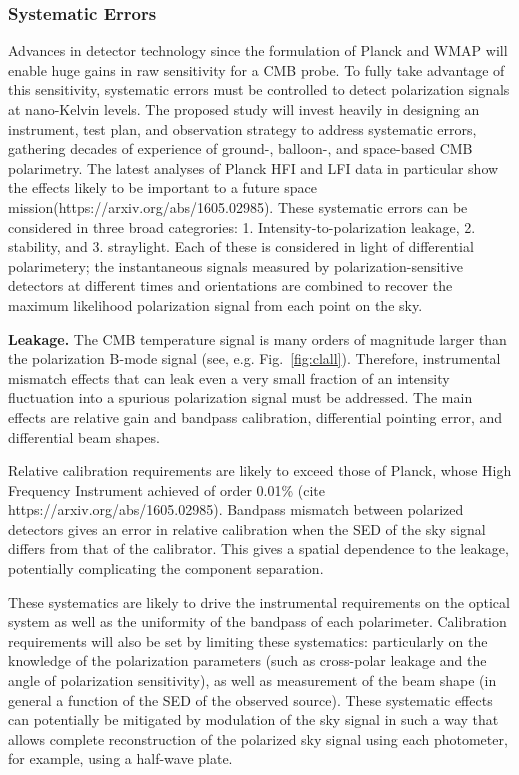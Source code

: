 \subsubsection{Systematic Errors}
Advances in detector technology since the formulation of Planck and WMAP will enable huge gains in raw sensitivity for a CMB probe. 
To fully take advantage of this sensitivity, systematic errors must be
controlled to detect polarization signals at nano-Kelvin levels. 
The proposed study will invest heavily in designing an instrument,
test plan, and observation strategy to address systematic errors,
gathering decades of experience of ground-, balloon-, and
space-based CMB polarimetry.  The latest analyses of Planck HFI and
LFI data in particular show the effects likely to be important to a
future space mission(https://arxiv.org/abs/1605.02985).
These systematic errors can be considered in three broad categrories:
1. Intensity-to-polarization leakage, 2. stability, and
3. straylight. 
Each of these is considered in light of differential
polarimetery; the instantaneous signals measured by
polarization-sensitive detectors at different times and orientations are combined to recover
the maximum likelihood polarization signal from each point on the sky.

\textbf{Leakage.} The CMB temperature signal is many orders of magnitude larger than the
polarization B-mode signal (see, e.g. Fig.~\ref{fig:clall}). 
 Therefore, instrumental mismatch effects that can leak
even a very small fraction of an intensity fluctuation into a spurious  polarization
signal must be addressed.  The main effects are relative gain and
bandpass calibration, differential pointing error, and differential beam
shapes.

Relative calibration requirements are likely to exceed those of
Planck, whose High Frequency Instrument achieved of order 0.01\% (cite
https://arxiv.org/abs/1605.02985).  Bandpass mismatch between
polarized detectors gives an error in relative calibration when the
SED of the sky signal differs from that of the calibrator.  This gives
a spatial dependence to the leakage, potentially complicating the
component separation.

These systematics are likely to drive the instrumental
requirements on the optical system as well as the uniformity of the
bandpass of each polarimeter.  Calibration requirements will also be
set by limiting these systematics: particularly on the
knowledge of the polarization parameters (such as cross-polar leakage
and the angle of polarization sensitivity), as well as measurement of
the beam shape (in general a function of the SED of the observed source).
These systematic effects can potentially be mitigated by modulation of the sky signal in
such a way that allows complete reconstruction of the 
polarized sky signal using each photometer, for example, using a
half-wave plate.  

